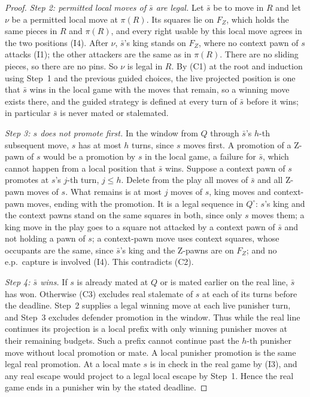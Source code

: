 \begin{proof}
\emph{Step 2: permitted local moves of $\bar s$ are legal.} Let $\bar s$ be to move in $R$ and let $\nu$
be a permitted local move at $\pi(R)$. Its squares lie on $F_Z$, which holds the same pieces in $R$ and $\pi(R)$, and every right usable by this local move agrees in the two positions (I4). After $\nu$, $\bar s$'s king stands on $F_Z$, where no context pawn of $s$ attacks (I1); the other
attackers are the same as in $\pi(R)$. There are no sliding pieces, so there are no pins. So $\nu$ is legal in $R$. By (C1) at the root and induction using Step~1 and the previous guided choices, the live projected position is one that $\bar s$ wins in the local game with the moves that remain, so a winning move exists there, and the
guided strategy is defined at every turn of $\bar s$ before it wins; in particular $\bar s$ is never mated or stalemated.

\emph{Step 3: $s$ does not promote first.} In the window from $Q$ through $\bar s$'s $h$-th subsequent move, $s$ has at most $h$ turns, since $s$ moves first. A promotion of a Z-pawn of $s$ would be a promotion by $s$ in the
local game, a failure for $\bar s$, which cannot happen from a local position that $\bar s$ wins. Suppose a context pawn of $s$ promotes at
$s$'s $j$-th turn, $j\le h$. Delete from the play all moves of $\bar s$ and all Z-pawn moves of $s$. What remains is at most
$j$ moves of $s$, king moves and context-pawn moves, ending with the promotion. It is a legal sequence in $Q^\circ$: $s$'s
king and the context pawns stand on the same squares in both, since only $s$ moves them; a king move in the play goes to a
square not attacked by a context pawn of $\bar s$ and not holding a pawn of $s$; a context-pawn move uses context squares,
whose occupants are the same, since $\bar s$'s king and the Z-pawns are on $F_Z$; and no e.p.\ capture is involved (I4).
This contradicts (C2).

\emph{Step 4: $\bar s$ wins.} If $s$ is already mated at $Q$ or is
mated earlier on the real line, $\bar s$ has won. Otherwise (C3)
excludes real stalemate of $s$ at each of its turns before the deadline.
Step~2 supplies a legal winning move at each live punisher turn, and
Step~3 excludes defender promotion in the window. Thus while the real
line continues its projection is a local prefix with only winning
punisher moves at their remaining budgets. Such a prefix cannot continue
past the $h$-th punisher move without local promotion or mate. A local
punisher promotion is the same legal real promotion. At a local mate
$s$ is in check in the real game by (I3), and any real escape would
project to a legal local escape by Step~1. Hence the real game ends in
a punisher win by the stated deadline.
\end{proof}

